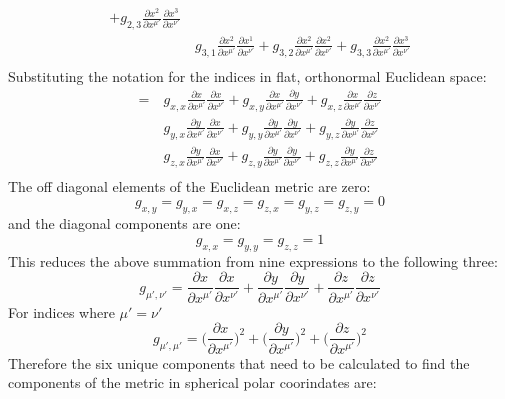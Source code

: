 \documentclass[a4paper]{article}
\begin{document}
\begin{enumerate}
\begin{enumerate}
\[\begin{align*}
    +g_{2,3}\frac{\partial x^2}{\partial x^{\mu'}}\frac{\partial x^3}{\partial x^{\nu'}}\\
    &\
     g_{3,1}\frac{\partial x^2}{\partial x^{\mu'}}\frac{\partial x^1}{\partial x^{\nu'}}
    +g_{3,2}\frac{\partial x^2}{\partial x^{\mu'}}\frac{\partial x^2}{\partial x^{\nu'}}
    +g_{3,3}\frac{\partial x^2}{\partial x^{\mu'}}\frac{\partial x^3}{\partial x^{\nu'}}\\
    \end{align*}
  \]
  Substituting the notation for the indices in flat, orthonormal Euclidean
  space:
  \[
    \begin{align*}
    =&\
     g_{x,x}\frac{\partial x}{\partial x^{\mu'}}\frac{\partial x}{\partial x^{\nu'}}
    +g_{x,y}\frac{\partial x}{\partial x^{\mu'}}\frac{\partial y}{\partial x^{\nu'}}
    +g_{x,z}\frac{\partial x}{\partial x^{\mu'}}\frac{\partial z}{\partial x^{\nu'}}\\
    &\ g_{y,x}\frac{\partial y}{\partial x^{\mu'}}\frac{\partial x}{\partial x^{\nu'}}
    +g_{y,y}\frac{\partial y}{\partial x^{\mu'}}\frac{\partial y}{\partial x^{\nu'}}
    +g_{y,z}\frac{\partial y}{\partial x^{\mu'}}\frac{\partial z}{\partial x^{\nu'}}\\
    &\
     g_{z,x}\frac{\partial y}{\partial x^{\mu'}}\frac{\partial x}{\partial x^{\nu'}}
    +g_{z,y}\frac{\partial y}{\partial x^{\mu'}}\frac{\partial y}{\partial x^{\nu'}}
    +g_{z,z}\frac{\partial y}{\partial x^{\mu'}}\frac{\partial z}{\partial x^{\nu'}}\\
    \end{align*}
  \]
  The off diagonal elements of the Euclidean metric are zero:
  \[
    g_{x,y} = g_{y,x} = g_{x,z} = g_{z,x} = g_{y,z} = g_{z,y} = 0
  \]
  and the diagonal components are one:
  \[
    g_{x,x} = g_{y,y} = g_{z,z} = 1
  \]
  This reduces the above summation from nine expressions to the following three: \[
    g_{\mu',\nu'} =
    \frac{\partial x}{\partial x^{\mu'}} \frac{\partial x}{\partial x^{\nu'}} +
    \frac{\partial y}{\partial x^{\mu'}} \frac{\partial y}{\partial x^{\nu'}} +
    \frac{\partial z}{\partial x^{\mu'}} \frac{\partial z}{\partial x^{\nu'}}
  \]
  For indices where $\mu'=\nu'$
  \[
    g_{\mu', \mu'} =
    \Bigg( \frac{\partial x}{\partial x^{\mu'}}\Bigg)^2+
    \Bigg(\frac{\partial y}{\partial x^{\mu'}}\Bigg)^2+
    \Bigg(\frac{\partial z}{\partial x^{\mu'}}\Bigg)^2
  \]
  Therefore the six unique components that need to be calculated to find the
  components of the metric in spherical polar coorindates are:
  \[
    \begin{align*}

\end{align*}\]
\end{enumerate}
\end{enumerate}
\end{document}
